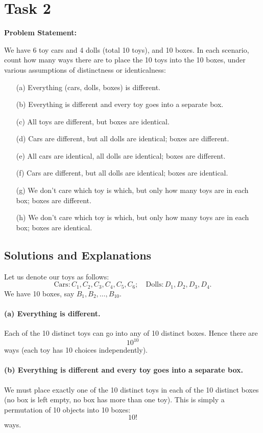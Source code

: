 \documentclass[docmute]{article}
\begin{document}
\bigskip

\section{Task 2}

\textbf{Problem Statement:}

We have 6 toy cars and 4 dolls (total 10 toys), and 10 boxes. In each scenario, count how many ways there are to place the 10 toys into the 10 boxes, under various assumptions of distinctness or identicalness:

\begin{enumerate}
  \item[(a)] Everything (cars, dolls, boxes) is different.
  \item[(b)] Everything is different and every toy goes into a separate box.
  \item[(c)] All toys are different, but boxes are identical.
  \item[(d)] Cars are different, but all dolls are identical; boxes are different.
  \item[(e)] All cars are identical, all dolls are identical; boxes are different.
  \item[(f)] Cars are different, but all dolls are identical; boxes are identical.
  \item[(g)] We don’t care which toy is which, but only how many toys are in each box; boxes are different.
  \item[(h)] We don’t care which toy is which, but only how many toys are in each box; boxes are identical.
\end{enumerate}

\subsection*{Solutions and Explanations}

Let us denote our toys as follows:
\[
\text{Cars}: C_1, C_2, C_3, C_4, C_5, C_6; 
\quad
\text{Dolls}: D_1, D_2, D_3, D_4.
\]
We have 10 boxes, say \(B_1, B_2, \dots, B_{10}\).

\paragraph{(a) Everything is different.}
Each of the 10 distinct toys can go into any of 10 distinct boxes. Hence there are 
\[
10^{10}
\]
ways (each toy has 10 choices independently).

\paragraph{(b) Everything is different and every toy goes into a separate box.}
We must place exactly one of the 10 distinct toys in each of the 10 distinct boxes (no box is left empty, no box has more than one toy). This is simply a permutation of 10 objects into 10 boxes:
\[
10! 
\]
ways.
\end{document}

